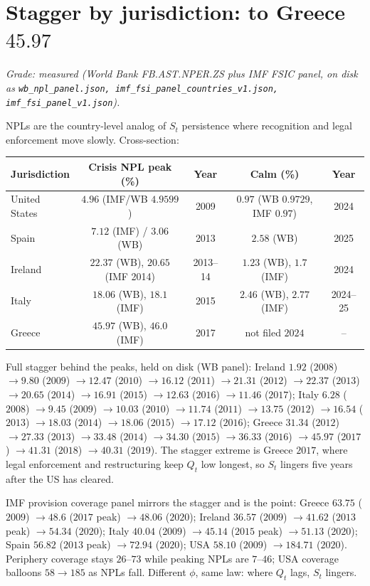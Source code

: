 \section{Stagger by jurisdiction: to Greece $45.97$}
\label{sec:npl-stagger}

\textit{Grade: measured (World Bank FB.AST.NPER.ZS plus IMF FSIC panel, on disk as \texttt{wb\_npl\_panel.json, imf\_fsi\_panel\_countries\_v1.json, imf\_fsi\_panel\_v1.json}).}

NPLs are the country-level analog of $S_t$ persistence where recognition and legal enforcement move slowly. Cross-section:

\begin{center}
\small
\begin{tabular}{lcccc}
\toprule
Jurisdiction & Crisis NPL peak (\%) & Year & Calm (\%) & Year \\
\midrule
United States & $4.96$ (IMF/WB $4.9599$) & 2009 & $0.97$ (WB $0.9729$, IMF $0.97$) & 2024 \\
Spain & $7.12$ (IMF) / $3.06$ (WB) & 2013 & $2.58$ (WB) & 2025 \\
Ireland & $22.37$ (WB), $20.65$ (IMF 2014) & 2013--14 & $1.23$ (WB), $1.7$ (IMF) & 2024 \\
Italy & $18.06$ (WB), $18.1$ (IMF) & 2015 & $2.46$ (WB), $2.77$ (IMF) & 2024--25 \\
Greece & $45.97$ (WB), $46.0$ (IMF) & 2017 & not filed $2024$ & -- \\
\bottomrule
\end{tabular}
\end{center}

Full stagger behind the peaks, held on disk (WB panel): Ireland $1.92$ ($2008$) $\to9.80$ ($2009$) $\to12.47$ ($2010$) $\to16.12$ ($2011$) $\to21.31$ ($2012$) $\to22.37$ ($2013$) $\to20.65$ ($2014$) $\to16.91$ ($2015$) $\to12.63$ ($2016$) $\to11.46$ ($2017$); Italy $6.28$ ($2008$) $\to9.45$ ($2009$) $\to10.03$ ($2010$) $\to11.74$ ($2011$) $\to13.75$ ($2012$) $\to16.54$ ($2013$) $\to18.03$ ($2014$) $\to18.06$ ($2015$) $\to17.12$ ($2016$); Greece $31.34$ ($2012$) $\to27.33$ ($2013$) $\to33.48$ ($2014$) $\to34.30$ ($2015$) $\to36.33$ ($2016$) $\to45.97$ ($2017$) $\to41.31$ ($2018$) $\to40.31$ ($2019$). The stagger extreme is Greece $2017$, where legal enforcement and restructuring keep $Q_t$ low longest, so $S_t$ lingers five years after the US has cleared.

IMF provision coverage panel mirrors the stagger and is the point: Greece $63.75$ ($2009$) $\to48.6$ ($2017$ peak) $\to48.06$ ($2020$); Ireland $36.57$ ($2009$) $\to41.62$ ($2013$ peak) $\to54.34$ ($2020$); Italy $40.04$ ($2009$) $\to45.14$ ($2015$ peak) $\to51.13$ ($2020$); Spain $56.82$ ($2013$ peak) $\to72.94$ ($2020$); USA $58.10$ ($2009$) $\to184.71$ ($2020$). Periphery coverage stays $26$--$73$ while peaking NPLs are $7$--$46$; USA coverage balloons $58\to185$ as NPLs fall. Different $\phi$, same law: where $Q_t$ lags, $S_t$ lingers.

